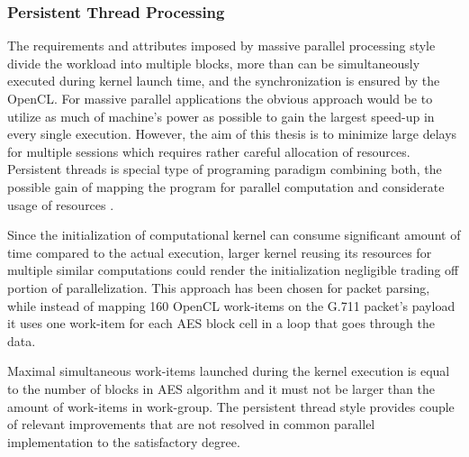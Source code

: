 \subsubsection*{Persistent Thread Processing}
The requirements and attributes imposed by massive parallel processing
style divide the workload into multiple blocks, more than can be simultaneously
executed during kernel launch time, and the synchronization is ensured by the
OpenCL. For massive parallel applications the obvious approach would be to 
utilize as much of machine's power as possible to gain the largest speed-up in 
every single execution. However, the aim of this thesis is to minimize large 
delays for multiple sessions which requires rather careful allocation of
resources. Persistent threads is special type of programing paradigm combining 
both, the possible gain of mapping the program for parallel computation and
considerate usage of resources \cite{pt}.

Since the initialization of computational kernel can consume significant amount 
of time compared to the actual execution, larger kernel reusing its resources 
for multiple similar computations could render the initialization negligible 
trading off portion of parallelization. This approach has been chosen for
packet parsing, while instead of mapping 160 OpenCL work-items on the G.711 
packet's payload it uses one work-item for each AES block cell in a loop that 
goes through the data.

Maximal simultaneous work-items launched during the kernel execution is equal
to the number of blocks in AES algorithm and it must not be larger than the
amount of work-items in work-group. The persistent thread style provides 
couple of relevant improvements that are not resolved in common parallel 
implementation to the satisfactory degree.


